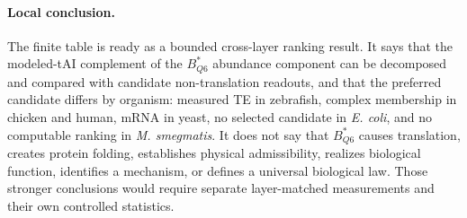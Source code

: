 \paragraph{Local conclusion.}
The finite table is ready as a bounded cross-layer ranking result.  It says that the modeled-tAI complement of the $B^*_{Q6}$ abundance component can be decomposed and compared with candidate non-translation readouts, and that the preferred candidate differs by organism: measured TE in zebrafish, complex membership in chicken and human, mRNA in yeast, no selected candidate in \emph{E. coli}, and no computable ranking in \emph{M. smegmatis}.  It does not say that $B^*_{Q6}$ causes translation, creates protein folding, establishes physical admissibility, realizes biological function, identifies a mechanism, or defines a universal biological law.  Those stronger conclusions would require separate layer-matched measurements and their own controlled statistics.